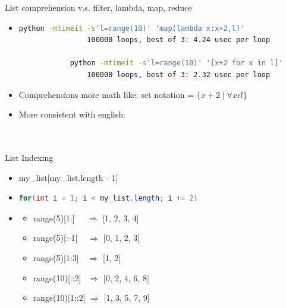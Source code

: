 \documentclass[11pt]{beamer}
\begin{document}
		\begin{frame}[fragile]{List comprehension v.s. filter, lambda, map, reduce}
			\begin{itemize}
			\item<1->
			\begin{lstlisting}[language=Bash]
			python -mtimeit -s'l=range(10)' 'map(lambda x:x+2,l)'
			    100000 loops, best of 3: 4.24 usec per loop

			python -mtimeit -s'l=range(10)' '[x+2 for x in l]'
			    100000 loops, best of 3: 2.32 usec per loop
			\end{lstlisting}

			\item<2-> Comprehensions more math like: set notation = $\{x + 2 \mid \forall x \epsilon l\}$

			\item<2-> More consistent with english: \\
				 \\
				 \\
			\end{itemize}
		\end{frame}
		
		\begin{frame}[fragile]{List Indexing}
			\begin{itemize}
				\item<1-> my\_list[my\_list.length - 1] \uncover<2->{v.s. my\_list[-1]}
				
				\item<3-> 
				\begin{lstlisting}[language=Java]
				for(int i = 1; i < my_list.length; i += 2)
				\end{lstlisting}
				
				\item<5->
				\begin{itemize}
                		\item[] range(5)[1:]    $\:\:\:\:\:\Rightarrow$ [1, 2, 3, 4]
                		\item[] range(5)[:-1]   $\:\:\:\:\Rightarrow$ [0, 1, 2, 3]
                		\item[] range(5)[1:3]   $\:\:\:\Rightarrow$ [1, 2]
                		\item[] range(10)[::2]  $\:\:\Rightarrow$ [0, 2, 4, 6, 8]
                		\item[] range(10)[1::2] $\Rightarrow$ [1, 3, 5, 7, 9]
				\end{itemize}
			\end{itemize}
		\end{frame}
		
\end{document}
